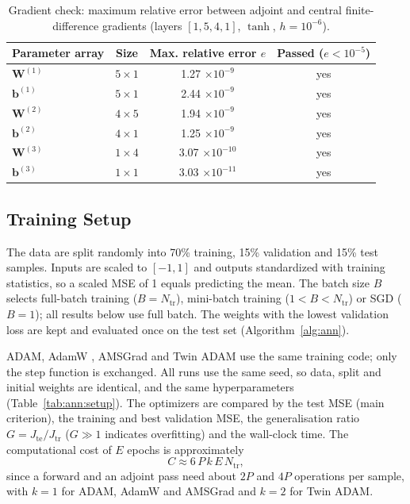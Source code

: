 \documentclass[11pt,a4paper]{article}
\begin{document}
\begin{table}[!htbp]
  \centering
  \caption{Gradient check: maximum relative error between adjoint and central finite-difference gradients (layers $[1,5,4,1]$, $\tanh$, $h=10^{-6}$).}
  \label{tab:ann:gradcheck}
  \begin{tabular}{lccc}
    \toprule
    \textbf{Parameter array} & \textbf{Size} & \textbf{Max. relative error $e$} & \textbf{Passed ($e<10^{-5}$)} \\
    \midrule
    $\bm{W}^{(1)}$ & $5\times1$ & 1.27 $\times10^{-9}$ & yes \\
    $\bm{b}^{(1)}$ & $5\times1$ & 2.44 $\times10^{-9}$ & yes \\
    $\bm{W}^{(2)}$ & $4\times5$ & 1.94 $\times10^{-9}$ & yes \\
    $\bm{b}^{(2)}$ & $4\times1$ & 1.25 $\times10^{-9}$ & yes \\
    $\bm{W}^{(3)}$ & $1\times4$ & 3.07 $\times10^{-10}$ & yes \\
    $\bm{b}^{(3)}$ & $1\times1$ & 3.03 $\times10^{-11}$ & yes \\
    \bottomrule
  \end{tabular}
\end{table}

\FloatBarrier
\subsection{Training Setup}
\label{sec:ann:data}
The data are split randomly into 70\% training, 15\% validation and 15\% test samples. Inputs are scaled to $[-1,1]$ and outputs standardized with training statistics, so a scaled MSE of 1 equals predicting the mean. The batch size $B$ selects full-batch training ($B=N_{\mathrm{tr}}$), mini-batch training ($1<B<N_{\mathrm{tr}}$) or SGD ($B=1$); all results below use full batch. The weights with the lowest validation loss are kept and evaluated once on the test set (Algorithm~\ref{alg:ann}).

ADAM, AdamW \cite{loshchilov2017decoupled}, AMSGrad \cite{reddi2018convergence} and Twin ADAM use the same training code; only the step function is exchanged. All runs use the same seed, so data, split and initial weights are identical, and the same hyperparameters (Table~\ref{tab:ann:setup}). The optimizers are compared by the test MSE (main criterion), the training and best validation MSE, the generalisation ratio $G = J_{\mathrm{te}}/J_{\mathrm{tr}}$ ($G\gg1$ indicates overfitting) and the wall-clock time. The computational cost of $E$ epochs is approximately
\begin{equation}
  C \approx 6\,P\,k\,E\,N_{\mathrm{tr}},
\end{equation}
since a forward and an adjoint pass need about $2P$ and $4P$ operations per sample, with $k=1$ for ADAM, AdamW and AMSGrad and $k=2$ for Twin ADAM.
\end{document}
